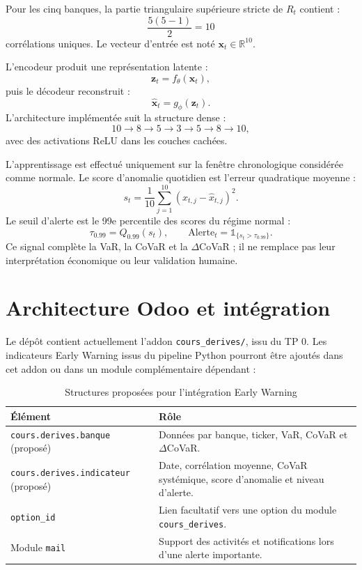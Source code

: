 \documentclass[12pt,a4paper]{article}
\begin{document}
Pour les cinq banques, la partie triangulaire supérieure stricte de $R_t$ contient :
\[
  \frac{5(5-1)}{2}=10
\]
corrélations uniques. Le vecteur d'entrée est noté $\mathbf{x}_t\in\mathbb{R}^{10}$.

L'encodeur produit une représentation latente :
\[
  \mathbf{z}_t=f_{\theta}(\mathbf{x}_t),
\]
puis le décodeur reconstruit :
\[
  \widehat{\mathbf{x}}_t=g_{\phi}(\mathbf{z}_t).
\]
L'architecture implémentée suit la structure dense :
\[
  10\rightarrow8\rightarrow5\rightarrow3
  \rightarrow5\rightarrow8\rightarrow10,
\]
avec des activations ReLU dans les couches cachées.

L'apprentissage est effectué uniquement sur la fenêtre chronologique considérée comme normale.
Le score d'anomalie quotidien est l'erreur quadratique moyenne :
\[
  s_t
  =
  \frac{1}{10}\sum_{j=1}^{10}
  (x_{t,j}-\widehat{x}_{t,j})^2.
\]
Le seuil d'alerte est le 99e percentile des scores du régime normal :
\[
  \tau_{0.99}=Q_{0.99}(s_t),
  \qquad
  \mathrm{Alerte}_t=\mathbb{1}_{\{s_t>\tau_{0.99}\}}.
\]
Ce signal complète la VaR, la CoVaR et la $\Delta$CoVaR ; il ne remplace pas leur interprétation
économique ou leur validation humaine.

\section{Architecture Odoo et intégration}

Le dépôt contient actuellement l'addon \texttt{cours\_derives/}, issu du TP 0. Les indicateurs
Early Warning issus du pipeline Python pourront être ajoutés dans cet addon ou dans un module
complémentaire dépendant :

\begin{table}[h]
  \centering
  \begin{tabular}{p{}p{}}
    \toprule
    \textbf{Élément} & \textbf{Rôle} \\
    \midrule
    \texttt{cours.derives.banque} (proposé) &
    Données par banque, ticker, VaR, CoVaR et $\Delta$CoVaR. \\
    \texttt{cours.derives.indicateur} (proposé) &
    Date, corrélation moyenne, CoVaR systémique, score d'anomalie et niveau d'alerte. \\
    \texttt{option\_id} &
    Lien facultatif vers une option du module \texttt{cours\_derives}. \\
    Module \texttt{mail} &
    Support des activités et notifications lors d'une alerte importante. \\
    \bottomrule
  \end{tabular}
  \caption{Structures proposées pour l'intégration Early Warning}
\end{table}
\end{document}
